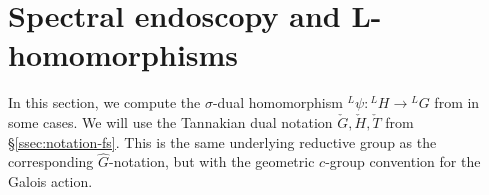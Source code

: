 \documentclass[reqno]{amsart}
\numberwithin{equation}{subsection}
\newcommand{\F}{\mathbf{F}}
\newcommand{\Q}{\mathbf{Q}}
\newcommand{\Z}{\mathbf{Z}}
\newcommand{\ol}[1]{\overline{#1}}
\newcommand{\wh}[1]{\widehat{#1}}
\newcommand{\co}{\colon}
\newcommand{\ld}{{}^L}
\newcommand{\chG}{\check{G}}
\newcommand{\chH}{\check{H}}
\newcommand{\chT}{\check{T}}
\renewcommand{\ss}{\mathrm{ss}}
\newtheorem{lemma}[thm]{Lemma}
\theoremstyle{remark}
\numberwithin{equation}{subsection}
\numberwithin{figure}{subsection}
\begin{document}

















\section{Spectral endoscopy and L-homomorphisms}\label{sec:spectral-endoscopy}


In this section, we compute the $\sigma$-dual homomorphism $\ld\psi\co \ld H \to \ld G$ from \cite[Theorem 1.3.1]{F24} in some cases. We will use the Tannakian dual notation $\chG,\chH,\chT$ from \S\ref{ssec:notation-fs}. This is the same underlying reductive group as the corresponding $\widehat{G}$-notation, but with the geometric $c$-group convention for the Galois action.
\end{document}
